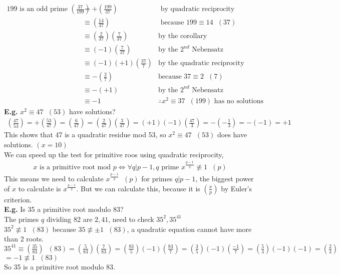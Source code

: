 \documentclass[11pt]{article}
\begin{document}
\begin{align*}
	199 \text{ is an odd prime } (\frac{37}{199})&= +(\frac{199}{37}) &\text{ by quadratic reciprocity}\\
	&\equiv (\frac{14}{37}) &\text{ because } 199 \equiv 14\hspace{7pt} (37)\\
	&\equiv (\frac{2}{37}) (\frac{7}{37}) &\text{by the corollary}\\
	&\equiv (-1) (\frac{7}{37}) &\text{by the }2^{nd} \text{ Nebensatz}\\
	&\equiv (-1)(+1) (\frac{37}{7}) &\text{by the quadratic reciprocity law}\\
	&\equiv -(\frac{2}{7}) &\text{because }37\equiv 2 \hspace{7pt} (7)\\
	&\equiv - (+1) &\text{by the } 2^{nd} \text{ Nebensatz} \\
	&\equiv -1 &\therefore x^2\equiv 37\hspace{7pt} (199) \text{ has no solutions}
\end{align*}
\textbf{E.g.} $x^2 \equiv 47 \hspace{7pt} (53) $ have solutions?
\begin{align*}
	(\frac{47}{53}) = +(\frac{53}{47}) = (\frac{6}{47}) = (\frac{2}{47})(\frac{3}{47}) = (+1)(-1) (\frac{47}{3}) = -(-\frac{1}{3}) = -(-1) = +1
\end{align*}
This shows that 47 is a quadratic residue mod 53, so $x^2 \equiv 47 \hspace{7pt}(53)$ does have solutions. $(x=10)$\\[1em]

We can speed up the test for primitive roos using quadratic reciprocity,
\begin{align*}
	x \text{ is a primitive root mod }p \iff \forall q | p-1, q \text{ prime } x^{\frac{p-1}{q}} \not \equiv 1 \hspace{7pt} (p)
\end{align*}
This means we need to calculate $x^{\frac{p-1}{q}} \hspace{7pt} (p)$ for primes $q | p-1$, the biggest power of $x$ to calculate is $x^{\frac{p-1}{2}}$. But we can calculate this, because it is $(\frac{x}{p})$ by Euler's criterion.\\[0.5em]

\textbf{E.g.} Is 35 a primitive root modulo 83?\\[0.5em]
The primes $q$ dividing 82 are $2,41$, need to check $35^2, 35^{41}$\\
$35^2 \not \equiv 1 \hspace{7pt} (83) $ because $35 \not \equiv \pm 1 \hspace{7pt} (83)$, a quadratic equation cannot have more than 2 roots.\\
$35^{41} \equiv (\frac{35}{83} ) \hspace{7pt} (83) = (\frac{5}{83}) (\frac{7}{83}) = (\frac{83}{5}) (-1) (\frac{83}{7}) = (\frac{3}{5}) (-1) (\frac{-1}{7}) = (\frac{5}{3}) (-1)(-1) = (\frac{2}{3})$  $= -1 \not \equiv 1 \hspace{7pt} (83)$ \\
So 35 is a primitive root modulo 83.
\end{document}

